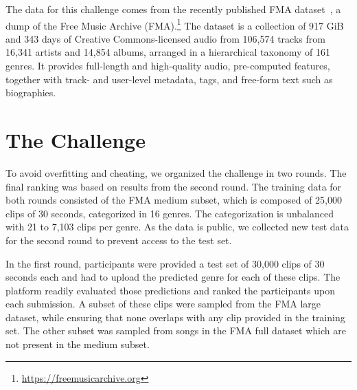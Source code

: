 \documentclass[sigconf]{acmart}
\begin{document}
The data for this challenge comes from the recently published FMA dataset~\cite{fma_dataset}, a dump of the Free Music Archive (FMA).\footnote{\url{https://freemusicarchive.org}}
The dataset is a collection of 917 GiB and 343 days of Creative Commons-licensed audio from 106,574 tracks from 16,341 artists and 14,854 albums, arranged in a hierarchical taxonomy of 161 genres.
It provides full-length and high-quality audio, pre-computed features, together with track- and user-level metadata, tags, and free-form text such as biographies.



\section{The Challenge}

To avoid overfitting and cheating, we organized the challenge in two rounds. The final ranking was based on results from the second round.
The training data for both rounds consisted of the FMA medium subset, which is composed of 25,000 clips of 30 seconds, categorized in 16 genres. The categorization is unbalanced with 21 to 7,103 clips per genre. %
As the data is public, we collected new test data for the second round to prevent access to the test set.

In the first round, participants were provided a test set of 30,000 clips of 30 seconds each and had to upload the predicted genre for each of these clips. The platform readily evaluated those predictions and ranked the participants upon each submission. A subset of these clips were sampled from the FMA large dataset, while ensuring that none overlaps with any clip provided in the training set. The other subset was sampled from songs in the FMA full dataset which are not present in the medium subset.
\end{document}
